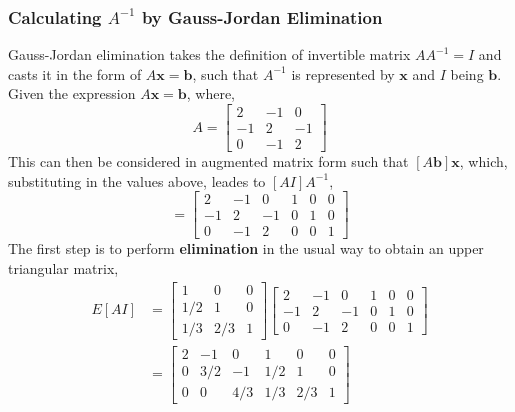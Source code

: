         \subsubsection{Calculating \(A^{-1}\) by Gauss-Jordan Elimination}
            Gauss-Jordan elimination takes the definition of invertible matrix \(AA^{-1} = I\) and casts it in the form
            of \(A\boldsymbol{x} = \boldsymbol{b}\), such that \(A^{-1}\) is represented by \(\boldsymbol{x}\) and 
            \(I\) being \(\boldsymbol{b}\). Given the expression \(A\boldsymbol{x} = \boldsymbol{b}\), where,
            \begin{equation}
                A =
                \begin{bmatrix}
                    2 & -1 & 0 \\
                    -1 & 2 & -1 \\
                    0 & -1 & 2
                \end{bmatrix}
            \end{equation}
            This can then be considered in augmented matrix form such that \([A\boldsymbol{b}]\boldsymbol{x}\), 
            which, substituting in the values above, leades to \([AI]A^{-1}\),
            \begin{equation}
                [AI] = 
                \begin{bmatrix}
                    2  & -1 & 0  & 1 & 0 & 0 \\
                    -1 & 2  & -1 & 0 & 1 & 0 \\ 
                    0  & -1 & 2  & 0 & 0 & 1
                \end{bmatrix}
            \end{equation}
            The first step is to perform \textbf{elimination} in the usual way to obtain an upper triangular matrix,
            \begin{equation}
                \begin{split}
                    E[AI] &= 
                    \begin{bmatrix}
                        1 & 0 & 0 \\
                        1/2 & 1 & 0 \\
                        1/3 & 2/3 & 1
                    \end{bmatrix}
                    \begin{bmatrix}
                        2  & -1 & 0  & 1 & 0 & 0 \\
                        -1 & 2  & -1 & 0 & 1 & 0 \\ 
                        0  & -1 & 2  & 0 & 0 & 1
                    \end{bmatrix} \\
                    &=
                    \begin{bmatrix}
                        2  & -1 & 0  & 1 & 0 & 0 \\
                        0 & 3/2 & -1 & 1/2 & 1 & 0 \\ 
                        0  & 0 & 4/3  & 1/3 & 2/3 & 1
                    \end{bmatrix}
                \end{split}
            \end{equation}
